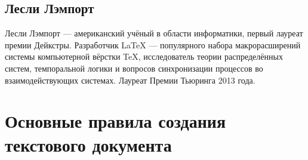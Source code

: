 \documentclass[a4paper,12pt]{article} %
\begin{document}
\subsection{Лесли Лэмпорт}
Лесли Лэмпорт --- американский учёный в области информатики, первый лауреат премии Дейкстры. Разработчик LaTeX --- популярного набора макрорасширений системы компьютерной вёрстки TeX, исследователь теории распределённых систем, темпоральной логики и вопросов синхронизации процессов во взаимодействующих системах. Лауреат Премии Тьюринга 2013 года.

\section{Основные правила создания текстового документа}
\end{document}
